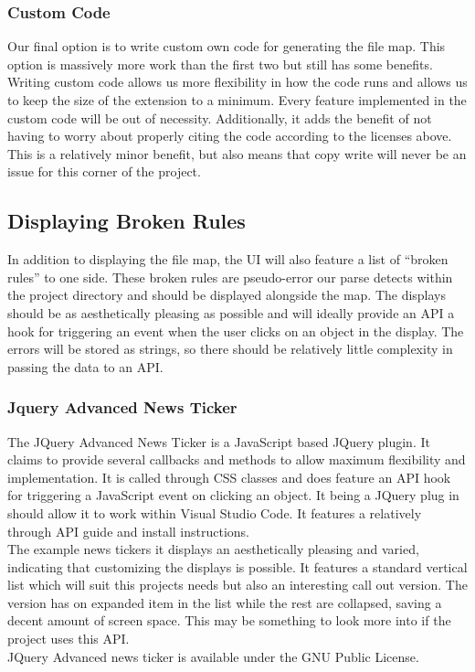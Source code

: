 \documentclass[letterpaper,10pt,titlepage,draftclsnofoot,onecolumn,onesided] {IEEEtran}
\begin{document}
\subsubsection{Custom Code}
Our final option is to write custom own code for generating the file map. 
This option is massively more work than the first two but still has some benefits. 
Writing custom code allows us more flexibility in how the code runs and allows us to keep the size of the extension to a minimum. 
Every feature implemented in the custom code will be out of necessity. 
Additionally, it adds the benefit of not having to worry about properly citing the code according to the licenses above. 
This is a relatively minor benefit, but also means that copy write will never be an issue for this corner of the project.

\subsection{Displaying Broken Rules}
In addition to displaying the file map, the UI will also feature a list of “broken rules” to one side. 
These broken rules are pseudo-error our parse detects within the project directory and should be displayed alongside the map. 
The displays should be as aesthetically pleasing as possible and will ideally provide an API a hook for triggering an event when the user clicks on an object in the display. 
The errors will be stored as strings, so there should be relatively little complexity in passing the data to an API. \\

\subsubsection{Jquery Advanced News Ticker}
The JQuery Advanced News Ticker is a JavaScript based JQuery plugin. 
It claims to provide several callbacks and methods to allow maximum flexibility and implementation. 
It is called through CSS classes and does feature an API hook for triggering a JavaScript event on clicking an object. 
It being a JQuery plug in should allow it to work within Visual Studio Code. 
It features a relatively through API guide and install instructions.
\\
The example news tickers it displays an aesthetically pleasing and varied, indicating that customizing the displays is possible. 
It features a standard vertical list which will suit this projects needs but also an interesting call out version. 
The version has on expanded item in the list while the rest are collapsed, saving a decent amount of screen space. 
This may be something to look more into if the project uses this API.
\\
JQuery Advanced news ticker is available under the GNU Public License.
\end{document}
